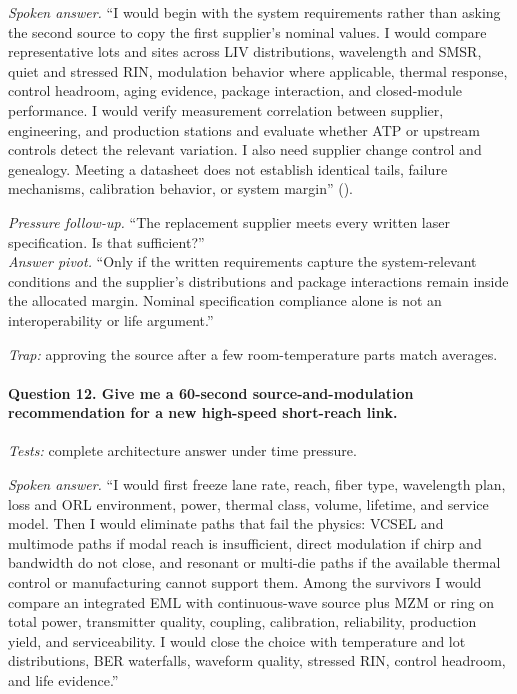 \textit{Spoken answer.}
``I would begin with the system requirements rather than asking the second
source to copy the first supplier's nominal values. I would compare
representative lots and sites across LIV distributions, wavelength and SMSR,
quiet and stressed RIN, modulation behavior where applicable, thermal response,
control headroom, aging evidence, package interaction, and closed-module
performance. I would verify measurement correlation between supplier,
engineering, and production stations and evaluate whether ATP or upstream
controls detect the relevant variation. I also need supplier change control and
genealogy. Meeting a datasheet does not establish identical tails, failure
mechanisms, calibration behavior, or system margin''
().

\textit{Pressure follow-up.} ``The replacement supplier meets every written
laser specification. Is that sufficient?''\\
\textit{Answer pivot.} ``Only if the written requirements capture the
system-relevant conditions and the supplier's distributions and package
interactions remain inside the allocated margin. Nominal specification
compliance alone is not an interoperability or life argument.''

\textit{Trap:} approving the source after a few room-temperature parts match
averages.

\paragraph{Question 12. Give me a 60-second source-and-modulation recommendation
for a new high-speed short-reach link.}
\textit{Tests:} complete architecture answer under time pressure.

\textit{Spoken answer.}
``I would first freeze lane rate, reach, fiber type, wavelength plan, loss and
ORL environment, power, thermal class, volume, lifetime, and service model.
Then I would eliminate paths that fail the physics: VCSEL and multimode paths
if modal reach is insufficient, direct modulation if chirp and bandwidth do not
close, and resonant or multi-die paths if the available thermal control or
manufacturing cannot support them. Among the survivors I would compare an
integrated EML with continuous-wave source plus MZM or ring on total power,
transmitter quality, coupling, calibration, reliability, production yield, and
serviceability. I would close the choice with temperature and lot
distributions, BER waterfalls, waveform quality, stressed RIN, control
headroom, and life evidence.''


